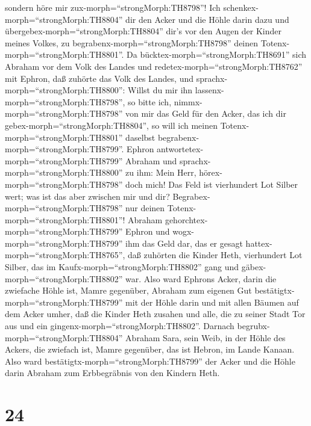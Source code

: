 sondern höre mir zux-morph=``strongMorph:TH8798''! Ich
schenkex-morph=``strongMorph:TH8804'' dir den Acker und die Höhle darin
dazu und übergebex-morph=``strongMorph:TH8804'' dir's vor den Augen der
Kinder meines Volkes, zu begrabenx-morph=``strongMorph:TH8798'' deinen
Totenx-morph=``strongMorph:TH8801''.  Da
bücktex-morph=``strongMorph:TH8691'' sich Abraham vor dem Volk des
Landes  und redetex-morph=``strongMorph:TH8762'' mit
Ephron, daß zuhörte das Volk des Landes, und
sprachx-morph=``strongMorph:TH8800'': Willst du mir ihn
lassenx-morph=``strongMorph:TH8798'', so bitte ich,
nimmx-morph=``strongMorph:TH8798'' von mir das Geld für den Acker, das
ich dir gebex-morph=``strongMorph:TH8804'', so will ich meinen
Totenx-morph=``strongMorph:TH8801'' daselbst
begrabenx-morph=``strongMorph:TH8799''.  Ephron
antwortetex-morph=``strongMorph:TH8799'' Abraham und
sprachx-morph=``strongMorph:TH8800'' zu ihm:  Mein Herr,
hörex-morph=``strongMorph:TH8798'' doch mich! Das Feld ist vierhundert
Lot Silber wert; was ist das aber zwischen mir und dir?
Begrabex-morph=``strongMorph:TH8798'' nur deinen
Totenx-morph=``strongMorph:TH8801''!  Abraham
gehorchtex-morph=``strongMorph:TH8799'' Ephron und
wogx-morph=``strongMorph:TH8799'' ihm das Geld dar, das er gesagt
hattex-morph=``strongMorph:TH8765'', daß zuhörten die Kinder Heth,
vierhundert Lot Silber, das im Kaufx-morph=``strongMorph:TH8802'' gang
und gäbex-morph=``strongMorph:TH8802'' war.  Also ward
Ephrons Acker, darin die zwiefache Höhle ist, Mamre gegenüber, Abraham
zum eigenen Gut bestätigtx-morph=``strongMorph:TH8799'' mit der Höhle
darin und mit allen Bäumen auf dem Acker umher,  daß die
Kinder Heth zusahen und alle, die zu seiner Stadt Tor aus und ein
gingenx-morph=``strongMorph:TH8802''.  Darnach
begrubx-morph=``strongMorph:TH8804'' Abraham Sara, sein Weib, in der
Höhle des Ackers, die zwiefach ist, Mamre gegenüber, das ist Hebron, im
Lande Kanaan.  Also ward
bestätigtx-morph=``strongMorph:TH8799'' der Acker und die Höhle darin
Abraham zum Erbbegräbnis von den Kindern Heth.

\hypertarget{section-23}{%
\section{24}\label{section-23}}

